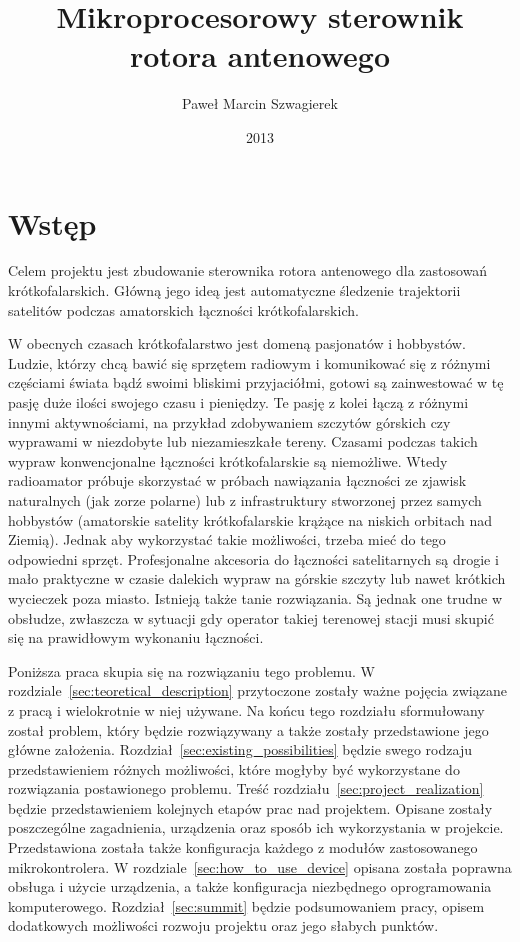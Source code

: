 \documentclass[eng,oneside]{mgr}
\title{Mikroprocesorowy sterownik rotora antenowego}
\author{Paweł Marcin Szwagierek}
\date{2013}
\begin{document}
	 
	\maketitle

	\tableofcontents

	\chapter{Wstęp}
	Celem projektu jest zbudowanie sterownika rotora antenowego dla zastosowań krótkofalarskich. Główną jego ideą jest automatyczne śledzenie trajektorii satelitów podczas amatorskich łączności krótkofalarskich. 

	W obecnych czasach krótkofalarstwo jest domeną pasjonatów i hobbystów. Ludzie, którzy chcą bawić się sprzętem radiowym i komunikować się z różnymi częściami świata bądź swoimi bliskimi przyjaciółmi, gotowi są zainwestować w tę pasję duże ilości swojego czasu i pieniędzy. Te pasję z kolei łączą z różnymi innymi aktywnościami, na przykład zdobywaniem szczytów górskich czy wyprawami w niezdobyte lub niezamieszkałe tereny. Czasami podczas takich wypraw konwencjonalne łączności krótkofalarskie są niemożliwe. Wtedy radioamator próbuje skorzystać w próbach nawiązania łączności ze zjawisk naturalnych (jak zorze polarne) lub z infrastruktury stworzonej przez samych hobbystów (amatorskie satelity krótkofalarskie krążące na niskich orbitach nad Ziemią). Jednak aby wykorzystać takie możliwości, trzeba mieć do tego odpowiedni sprzęt. Profesjonalne akcesoria do łączności satelitarnych są drogie i mało praktyczne w czasie dalekich wypraw na górskie szczyty lub nawet krótkich wycieczek poza miasto. Istnieją także tanie rozwiązania. Są jednak one trudne w obsłudze, zwłaszcza w sytuacji gdy operator takiej terenowej stacji musi skupić się na prawidłowym wykonaniu łączności.

	Poniższa praca skupia się na rozwiązaniu tego problemu. W rozdziale~\ref{sec:teoretical_description} przytoczone zostały ważne pojęcia związane z pracą i wielokrotnie w niej używane. Na końcu tego rozdziału sformułowany został problem, który będzie rozwiązywany a także  zostały przedstawione jego główne założenia. Rozdział~\ref{sec:existing_possibilities} będzie swego rodzaju przedstawieniem różnych możliwości, które mogłyby być wykorzystane do rozwiązania postawionego problemu. Treść rozdziału~\ref{sec:project_realization} będzie przedstawieniem kolejnych etapów prac nad projektem. Opisane zostały poszczególne zagadnienia, urządzenia oraz sposób ich wykorzystania w projekcie. Przedstawiona została także konfiguracja każdego z modułów zastosowanego mikrokontrolera. W rozdziale~\ref{sec:how_to_use_device} opisana została poprawna obsługa i użycie urządzenia, a także konfiguracja niezbędnego oprogramowania komputerowego. Rozdział~\ref{sec:summit} będzie podsumowaniem pracy, opisem dodatkowych możliwości rozwoju projektu oraz jego słabych punktów.
\end{document}
